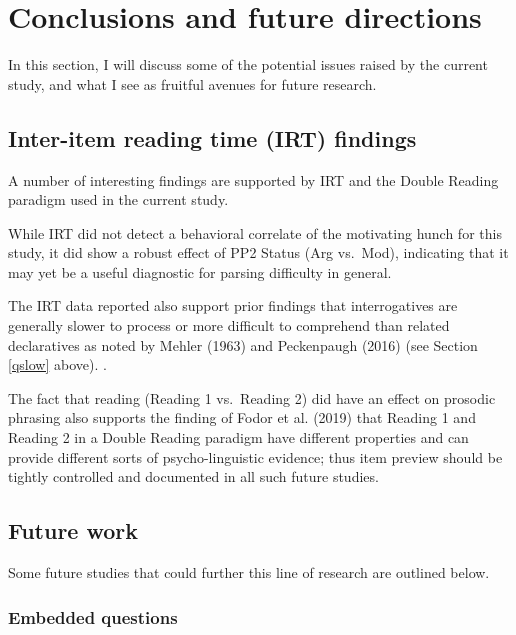 \documentclass[11pt,oneside]{book}
\begin{document}
\hypertarget{confound}{%
\section{Conclusions and future directions}\label{confound}}

In this section, I will discuss some of the potential issues raised by the current study, and what I see as fruitful avenues for future research.

\hypertarget{inter-item-reading-time-irt-findings}{%
\subsection{Inter-item reading time (IRT) findings}\label{inter-item-reading-time-irt-findings}}

A number of interesting findings are supported by IRT and the Double Reading paradigm used in the current study.

While IRT did not detect a behavioral correlate of the motivating hunch for this study, it did show a robust effect of PP2 Status (Arg vs.~Mod), indicating that it may yet be a useful diagnostic for parsing difficulty in general.

The IRT data reported also support prior findings that interrogatives are generally slower to process or more difficult to comprehend than related declaratives as noted by Mehler (1963) and Peckenpaugh (2016) (see Section \ref{qslow} above). .

The fact that reading (Reading 1 vs.~Reading 2) did have an effect on prosodic phrasing also supports the finding of Fodor et al. (2019) that Reading 1 and Reading 2 in a Double Reading paradigm have different properties and can provide different sorts of psycho-linguistic evidence; thus item preview should be tightly controlled and documented in all such future studies.

\hypertarget{future-work}{%
\subsection{Future work}\label{future-work}}

Some future studies that could further this line of research are outlined below.

\hypertarget{embedded-questions}{%
\subsubsection{Embedded questions}\label{embedded-questions}}
\end{document}
